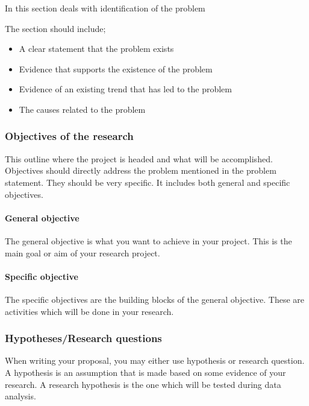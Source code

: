 \documentclass[
  12pt,
  a4paper,
  DIV=11,
  numbers=noendperiod]{scrartcl}
\let\oldparagraph\paragraph
\renewcommand{\paragraph}[1]{\oldparagraph{#1}\mbox{}}
\begin{document}
In this section deals with identification of the problem

The section should include;

\begin{itemize}
\item
  A clear statement that the problem exists
\item
  Evidence that supports the existence of the problem
\item
  Evidence of an existing trend that has led to the problem
\item
  The causes related to the problem
\end{itemize}

\hypertarget{objectives-of-the-research}{%
\subsubsection{Objectives of the
research}\label{objectives-of-the-research}}

This outline where the project is headed and what will be accomplished.
Objectives should directly address the problem mentioned in the problem
statement. They should be very specific. It includes both general and
specific objectives.

\hypertarget{general-objective}{%
\paragraph{General objective}\label{general-objective}}

The general objective is what you want to achieve in your project. This
is the main goal or aim of your research project.

\hypertarget{specific-objective}{%
\paragraph{Specific objective}\label{specific-objective}}

The specific objectives are the building blocks of the general
objective. These are activities which will be done in your research.

\hypertarget{hypothesesresearch-questions}{%
\subsubsection{Hypotheses/Research
questions}\label{hypothesesresearch-questions}}

When writing your proposal, you may either use hypothesis or research
question. A hypothesis is an assumption that is made based on some
evidence of your research. A research hypothesis is the one which will
be tested during data analysis.
\end{document}
